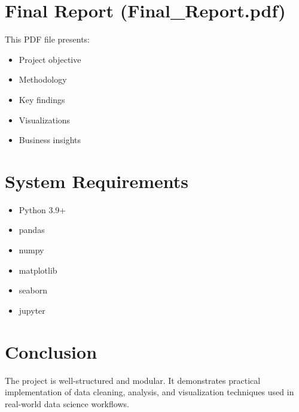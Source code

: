 \documentclass[12pt]{article}
\begin{document}
	\section{Final Report (Final\_Report.pdf)}
	
	This PDF file presents:
	
	\begin{itemize}
		\item Project objective
		\item Methodology
		\item Key findings
		\item Visualizations
		\item Business insights
	\end{itemize}
	
	\section{System Requirements}
	
	\begin{itemize}
		\item Python 3.9+
		\item pandas
		\item numpy
		\item matplotlib
		\item seaborn
		\item jupyter
	\end{itemize}
	
	\section{Conclusion}
	
	The project is well-structured and modular.  
	It demonstrates practical implementation of data cleaning, 
	analysis, and visualization techniques used in real-world 
	data science workflows.
	
\end{document}
